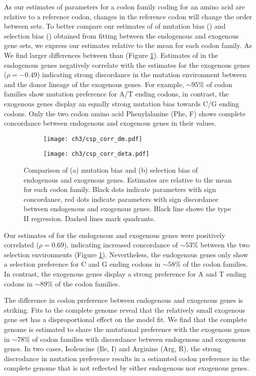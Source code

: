 As our estimates of parameters for a codon family coding for an amino acid are relative to a reference codon, changes in the reference codon will change the order between sets.
To better compare our estimates of of mutation bias (\DM) and selection bias (\DE) obtained from fitting \ROC between the endogenous and exogenous gene sets, we express our estimates relative to the mean for each codon family.
As 
We find larger differences between \DM than \DE (Figure \ref{fig:csp_comp}). 
Estimates of \DM in the endogenous genes negatively correlate with the \DM estimates for the exogenous genes ($\rho = -0.49$) indicating strong discordance in the mutation environment between \kluyveri and the donor lineage of the exogenous genes.
For example, $\sim 95 \%$ of codon families show mutation preference for A/T ending codons, in contrast, the exogenous genes display an equally strong mutation bias towards C/G ending codons.
Only the two codon amino acid Phenylalanine (Phe, F) shows complete concordance between endogenous and exogenous genes in their \DM values.
\begin{figure}[h]
    \centering
    \begin{subfigure}
        \centering
        \texttt{[image: ch3/csp\_corr\_dm.pdf]}
    \end{subfigure}
    \begin{subfigure}
        \centering
        \texttt{[image: ch3/csp\_corr\_deta.pdf]}
    \end{subfigure}
    \caption{Comparison of (a) mutation bias \DM and (b) selection bias \DE of endogenous and exogenous genes. Estimates are relative to the mean for each codon family. Black dots indicate parameters with sign concordance, red dots indicate parameters with sign discordance between endogenous and exogenous genes. Black line shows the type II regression. Dashed lines mark quadrants.}
    \label{fig:csp_comp}
\end{figure}

Our estimates of \DE for the endogenous and exogenous genes were positively correlated ($\rho = 0.69$), indicating increased concordance of $\sim53\%$ between the two selection environments  (Figure \ref{fig:csp_comp}).
Nevertheless, the endogenous genes only show a selection preference for C and G ending codons in $\sim58\%$ of the codon families.
In contrast, the exogenous genes display a strong preference for A and T ending codons in $\sim89\%$ of the codon families.

The difference in codon preference between endogenous and exogenous genes is striking.
Fits to the complete \kluyveri genome reveal that the relatively small exogenous gene set has a disproportional effect on the model fit.
We find that the complete \kluyveri genome is estimated to share the mutational preference with the exogenous genes in $\sim78\%$ of codon families with discordance between endogenous and exogenous genes.
In two cases, Isoleucine (Ile, I) and Arginine (Arg, R), the strong discrodance in mutation preference results in a estiamted codon preference in the complete \kluyveri genome that is not reflected by either endogenous nor exogenous genes.

